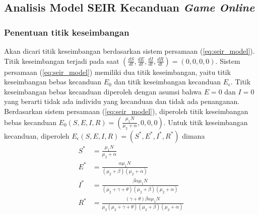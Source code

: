 \documentclass[a4paper, 12pt]{article}
\newcommand{\runninghead}[1]{%
  \fancyhead[L]{#1}
  \fancyhead[R]{\thepage}
}
\begin{document}
\clearpage
\runninghead{Side (2020)}
\setcounter{page}{97}

\subsection{Analisis Model SEIR Kecanduan \textit{Game Online}}
\subsubsection{Penentuan titik keseimbangan}
Akan dicari titik keseimbangan berdasarkan sistem persamaan (\ref{eq:seir_model}). Titik keseimbangan terjadi pada saat $(\frac{dS}{dt}, \frac{dE}{dt}, \frac{dI}{dt}, \frac{dR}{dt}) = (0,0,0,0)$. Sistem persamaan (\ref{eq:seir_model}) memiliki dua titik keseimbangan, yaitu titik keseimbangan bebas kecanduan $E_0$ dan titik keseimbangan kecanduan $E_\epsilon$. Titik keseimbangan bebas kecanduan diperoleh dengan asumsi bahwa $E = 0$ dan $I = 0$ yang berarti tidak ada individu yang kecanduan dan tidak ada penanganan. Berdasarkan sistem persamaan (\ref{eq:seir_model}), diperoleh titik keseimbangan bebas kecanduan $E_0(S, E, I, R) = (\frac{\mu_1 N}{\mu_2+\alpha}, 0,0,0)$. Untuk titik keseimbangan kecanduan, diperoleh $E_\epsilon(S, E, I, R) = (S^*, E^*, I^*, R^*)$ dimana
\begin{align*}
    S^* &= \frac{\mu_1 N}{\mu_2+\alpha} \\
    E^* &= \frac{\alpha \mu_1 N}{(\mu_2+\beta)(\mu_2+\alpha)} \\
    I^* &= \frac{\beta \alpha \mu_1 N}{(\mu_2+\gamma+\theta)(\mu_2+\beta)(\mu_2+\alpha)} \\
    R^* &= \frac{(\gamma+\theta)\beta \alpha \mu_1 N}{\mu_2(\mu_2+\gamma+\theta)(\mu_2+\beta)(\mu_2+\alpha)}
\end{align*}
\end{document}
